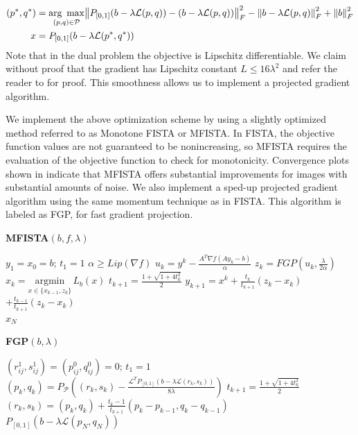 \documentclass[10pt,a4paper]{article}
\begin{document}
	\begin{align*}
	(p^*,q^*) &= \underset{(p,q) \in \mathcal{P}}{\text{arg }\max}  \norm{P_{[0,1]}(b- \lambda\mathcal{L}(p,q)) -(b- \lambda\mathcal{L}(p,q))}_F^2 - \norm{b- \lambda\mathcal{L}(p,q)}_F^2+ \norm{b}_F^2\\
	x &= P_{[0,1]}(b- \lambda\mathcal{L}(p^*,q^*)) \\
	\end{align*}
	Note that in the dual problem the objective is Lipschitz differentiable.  We claim without proof that the gradient has Lipschitz constant $L \leq 16 \lambda^2$ and refer the reader to \cite{TV} for proof.  This smoothness allows us to implement a projected gradient algorithm.
	
	We implement the above optimization scheme by using a slightly optimized method referred to as Monotone FISTA or MFISTA. In FISTA, the objective function values are not guaranteed to be nonincreasing, so MFISTA requires the evaluation of the objective function to check for monotonicity.  Convergence plots shown in \cite{TV} indicate that MFISTA offers substantial improvements for images with substantial amounts of noise.  We also implement a sped-up projected gradient algorithm using the same momentum technique as in FISTA.  This algorithm is labeled as FGP, for fast gradient projection. \\
	\begin{framed}
		\begin{minipage}{0.48\textwidth}
			\textbf{MFISTA$(b,f, \lambda)$}
			\begin{algorithmic}
				\State $y_1 = x_0 = b; \, t_1 = 1$
				\State $\alpha \geq Lip(\nabla f)$
				\State $u_k = y^k - \frac{A^T\nabla f (A y_k - b)}{\alpha}$
				\State $z_k = FGP(u_k, \frac{\lambda}{2 \alpha})$
				\State $x_k = \underset{x \in \{x_{k-1},z_k\}}{\text{argmin}} \,L_b(x)$
				\State $t_{k+1} = \frac{1 + \sqrt{1 + 4t_k^2}}{2}$ 
				\State $y_{k+1} = x^k + \frac{t_k}{t_{k+1}}(z_k - x_k)$ 
				\State \hspace{10 mm}$+ \frac{t_{k-1}}{t_{k+1}}(z_k - x_k) $
				\EndFor\\
				\Return $x_N$
			\end{algorithmic}
		\end{minipage}
		\begin{minipage}{0.48\textwidth}
			
			\textbf{FGP$(b, \lambda)$}
			\begin{algorithmic}
				\State $(r_{ij}^1, s_{ij}^1) = (p_{ij}^0, q_{ij}^0) = 0; \, t_1 = 1$
				\For {$k = 1:N$}
				\State $(p_k,q_k) = P_\mathcal{P} \left( (r_k,s_k) - \frac{\mathcal{L}^TP_{[0,1]} (b - \lambda \mathcal{L}(r_k,s_k))}{8\lambda} \right)$
				\State $t_{k+1} = \frac{1 + \sqrt{1 + 4t_k^2}}{2}$ 
				\State $(r_k,s_k) = (p_k,q_k) + \frac{t_k-1}{t_{k+1}}(p_k-p_{k-1}, q_k-q_{k-1})$ 
				\EndFor \\
				\Return $P_{[0,1]} (b - \lambda \mathcal{L}(p_N,q_N))$
			\end{algorithmic}
			
		\end{minipage}
	\end{framed}
	
\end{document}
